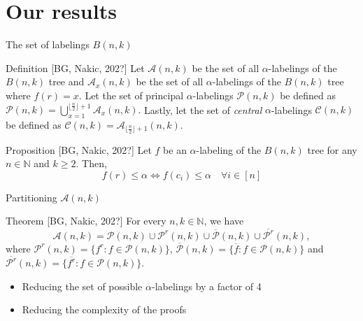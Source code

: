 \documentclass{beamer}
\begin{document}
\section{Our results}

\begin{frame}{The set of labelings \( B(n, k) \)}
  \begin{block}{Definition [BG, Nakic, 202?]}
    Let $\mathcal{A}(n,k)$ be the set of all $\alpha$-labelings of the $B(n,k)$ tree and $\mathcal{A}_x(n,k)$ be the set of all $\alpha$-labelings of the $B(n,k)$ tree where $f(r) = x$. Let the set of principal $\alpha$-labelings $\mathcal{P}(n,k)$ be defined as $\mathcal{P}(n, k) = \bigcup\limits_{x = 1}^{\lfloor \frac{n}{2} \rfloor + 1} \mathcal{A}_x(n, k).$ Lastly, let the set of \textit{central} $\alpha$-labelings $\mathcal{C}(n,k)$ be defined as $\mathcal{C}(n, k) = \mathcal{A}_{\lfloor \frac{n}{2} \rfloor + 1}(n, k)$.
  \end{block}
  \begin{block}{Proposition [BG, Nakic, 202?]}
    Let $f$ be an $\alpha$-labeling of the $B(n,k)$ tree for any $n \in \mathbb{N}$ and $k \ge 2$. Then,
    $$
    f(r) \le \alpha \iff f(c_i) \le \alpha \quad \forall i \in [n]
    $$
  \end{block}
\end{frame}

\begin{frame}{Partitioning \( \mathcal{A}(n, k) \)}
  \begin{block}{Theorem [BG, Nakic, 202?]}
    For every $n, k \in \mathbb{N}$, we have
    $$
    \mathcal{A}(n, k) = \mathcal{P}(n, k) \cup \mathcal{P}^r(n, k) \cup \overline{\mathcal{P}}(n, k) \cup \overline{\mathcal{P}^r}(n, k),
    $$
    where $\mathcal{P}^r(n, k) = \{f^r : f \in \mathcal{P}(n, k)\}$, $\overline{\mathcal{P}}(n, k) = \{\overline{f} : f \in \mathcal{P}(n, k)\}$ and $\overline{\mathcal{P}^r}(n, k) = \{\overline{f^r} : f \in \mathcal{P}(n, k)\}$.
  \end{block}
  \begin{itemize}
    \item Reducing the set of possible $\alpha$-labelings by a factor of 4
    \item Reducing the complexity of the proofs
  \end{itemize}
\end{frame}
\end{document}
